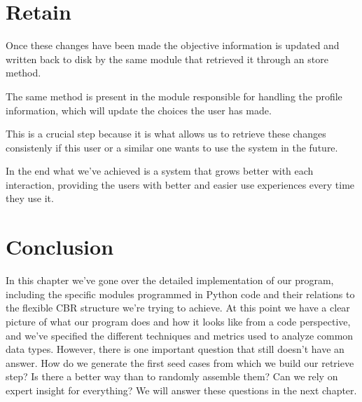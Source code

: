 \section{Retain}
\label{cap6:sec:retain}

\begin{figure}[!htb]
    \caption{\label{fig:shutdown}}
\end{figure}

Once these changes have been made the objective information is updated and written back to disk by the same module that retrieved it through an store method.

The same method is present in the module responsible for handling the profile information, which will update the choices the user has made.

This is a crucial step because it is what allows us to retrieve these changes consistenly if this user or a similar one wants to use the system in the future.

In the end what we've achieved is a system that grows better with each interaction, providing the users with better and easier use experiences every time they use it.

\section{Conclusion}
In this chapter we've gone over the detailed implementation of our program, including the specific modules programmed in Python code and their relations to the flexible CBR structure we're trying to achieve.
At this point we have a clear picture of what our program does and how it looks like from a code perspective, and we've specified the different techniques and metrics used to analyze common data types.
However, there is one important question that still doesn't have an answer. How do we generate the first seed cases from which we build our retrieve step? Is there a better way than to randomly assemble them? Can we rely on expert insight for everything? We will answer these questions in the next chapter.
\medskip
